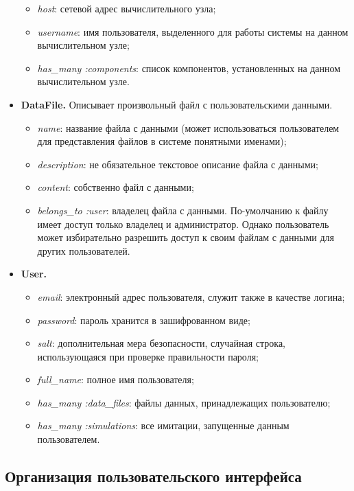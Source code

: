 \begin{itemize}
\begin{itemize}
      \item \emph{host}: сетевой адрес вычислительного узла;
      \item \emph{username}: имя пользователя, выделенного для работы системы на данном вычислительном узле;
      \item \emph{has\_many :components}: список компонентов, установленных на данном вычислительном узле.
    \end{itemize}
  \item \textbf{DataFile.} Описывает произвольный файл с пользовательскими данными. 
    \begin{itemize}
      \item \emph{name}: название файла с данными (может использоваться пользователем для представления файлов в системе понятными именами);
      \item \emph{description}: не обязательное текстовое описание файла с данными;
      \item \emph{content}: собственно файл с данными;
      \item \emph{belongs\_to :user}: владелец файла с данными. По-умолчанию к файлу имеет доступ только владелец и администратор. Однако пользователь может избирательно разрешить доступ к своим файлам с данными для других пользователей.
    \end{itemize}
  \item \textbf{User.}
    \begin{itemize}
      \item \emph{email}: электронный адрес пользователя, служит также в качестве логина;
      \item \emph{password}: пароль хранится в зашифрованном виде;
      \item \emph{salt}: дополнительная мера безопасности, случайная строка, использующаяся при проверке правильности пароля;
      \item \emph{full\_name}: полное имя пользователя;
      \item \emph{has\_many :data\_files}: файлы данных, принадлежащих пользователю;
      \item \emph{has\_many :simulations}: все имитации, запущенные данным пользователем.
    \end{itemize}
\end{itemize}      

\subsection{Организация пользовательского интерфейса}

